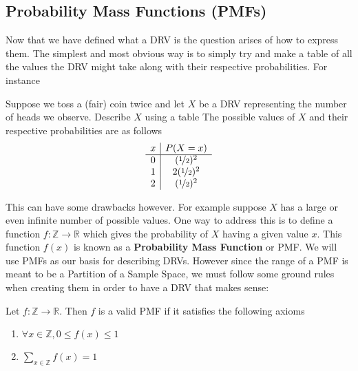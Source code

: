 \documentclass{report}
\begin{document}
\subsection{Probability Mass Functions (PMFs)}
Now that we have defined what a DRV is the question arises of how to express them. The simplest and most obvious way is to simply try and make a table of all the values the DRV might take along with their respective probabilities. For instance
\begin{example}
    Suppose we toss a (fair) coin twice and let $X$ be a DRV representing the number of heads we observe. Describe $X$ using a table
    \solution
    The possible values of $X$ and their respective probabilities are as follows
        \[
            \begin{array}{c|c}
                x & P(X=x) \\
                \hline
                0 & (\nicefrac 12)^2 \\
                1 & 2(\nicefrac 12)^2 \\
                2 & (\nicefrac 12)^2 
            \end{array}
        \]
\end{example}
This can have some drawbacks however. For example suppose $X$ has a large or even infinite number of possible values. One way to address this is to define a function $f: \mathbb Z\to \mathbb R$ which gives the probability of $X$ having a given value $x$. This function $f(x)$ is known as a \textbf{Probability Mass Function} or PMF. We will use PMFs as our basis for describing DRVs. However since the range of a PMF is meant to be a Partition of a Sample Space, we must follow some ground rules when creating them in order to have a DRV that makes sense:
\begin{definition}
    Let $f:\mathbb Z\to \mathbb R$. Then $f$ is a valid PMF if it satisfies the following axioms 
    \begin{enumerate}
        \item $\forall x\in\mathbb Z, 0\le f(x) \le 1$
        \item $\displaystyle\sum_{x\in\mathbb Z} f(x)= 1$
    \end{enumerate}
\end{definition}
\end{document}
